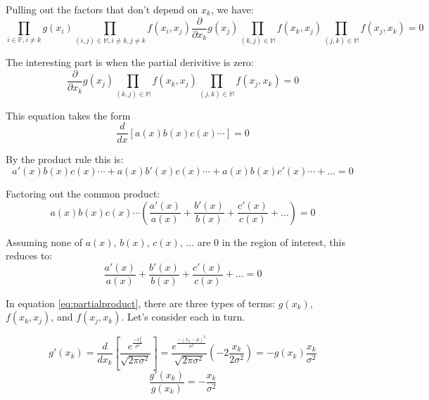 \documentclass{article}
\begin{document}
Pulling out the factors that don't depend on $x_k$, we have:
\begin{equation}
  \prod_{i \in \mathbb{P}, i \ne k} g(x_i)
  \prod_{(i, j) \in \mathbb{M}, i \ne k, j \ne k} f(x_i, x_j)
  \frac{\partial}{\partial x_k} g(x_j)
      \prod_{(k, j) \in \mathbb{M}} f(x_k, x_j)
      \prod_{(j, k) \in \mathbb{M}} f(x_j, x_k)
      = 0
\end{equation}

The interesting part is when the partial derivitive is zero:
\begin{equation} \label{eq:partialproduct}
  \frac{\partial}{\partial x_k} g(x_j)
      \prod_{(k, j) \in \mathbb{M}} f(x_k, x_j)
      \prod_{(j, k) \in \mathbb{M}} f(x_j, x_k)
      = 0
\end{equation}

This equation takes the form
\begin{equation}
  \frac{d}{dx}[a(x) b(x) c(x) \cdots] = 0
\end{equation}

By the product rule this is:
\begin{equation}
    a'(x) b(x) c(x) \cdots
  + a(x) b'(x) c(x) \cdots
  + a(x) b(x) c'(x) \cdots + \ldots = 0
\end{equation}

Factoring out the common product:
\begin{equation}
  a(x) b(x) c(x) \cdots (
      \frac{a'(x)}{a(x)}
    + \frac{b'(x)}{b(x)}
    + \frac{c'(x)}{c(x)}
    + \ldots) = 0
\end{equation}

Assuming none of $a(x)$, $b(x)$, $c(x)$, $\ldots$ are 0 in the region of
interest, this reduces to:
\begin{equation}
      \frac{a'(x)}{a(x)}
    + \frac{b'(x)}{b(x)}
    + \frac{c'(x)}{c(x)}
    + \ldots = 0
\end{equation}

In equation \ref{eq:partialproduct}, there are three types of terms: $g(x_k)$, 
$f(x_k, x_j)$, and $f(x_j, x_k)$. Let's consider each in turn.

\begin{equation}
  g'(x_k) = \frac{d}{d x_k} [\frac{e^{\frac{-x_k^2}{\sigma^2}}}{\sqrt{2\pi\sigma^2}}]
  = \frac{e^{\frac{-(x_k - \mu)^2}{\sigma^2}}}{\sqrt{2\pi\sigma^2}}
  (-2 \frac{x_k}{2 \sigma^2})
    = -g(x_k)\frac{x_k}{\sigma^2}
\end{equation}
\begin{equation}
  \frac{g'(x_k)}{g(x_k)} = -\frac{x_k}{\sigma^2}
\end{equation}
\end{document}

